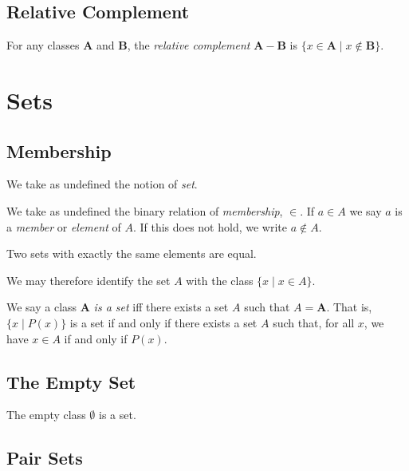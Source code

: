 \section{Relative Complement}

\begin{definition}
    For any classes $\mathbf{A}$ and $\mathbf{B}$, the \emph{relative complement}
    $\mathbf{A} - \mathbf{B}$ is $\{ x \in \mathbf{A} \mid x \notin \mathbf{B} \}$.
\end{definition}

\chapter{Sets}

\section{Membership}

We take as undefined the notion of \emph{set}.

We take as undefined the binary relation of \emph{membership}, $\in$. If $a \in A$ we say $a$ is a \emph{member} or \emph{element} of $A$.
If this does not hold, we write $a \notin A$.

\begin{axiom}
    Two sets with exactly the same elements are equal.
\end{axiom}

We may therefore identify the set $A$ with the class $\{x \mid x \in A \}$.

We say a class $\mathbf{A}$ \emph{is a set} iff there exists a set $A$
such that $A = \mathbf{A}$. That is, $\{ x \mid P(x) \}$ is a set if and only
if there exists a set $A$ such that, for all $x$, we have $x \in A$ if and
only if $P(x)$.

\section{The Empty Set}

\begin{axiom}
    The empty class $\emptyset$ is a set.
\end{axiom}

\section{Pair Sets}

